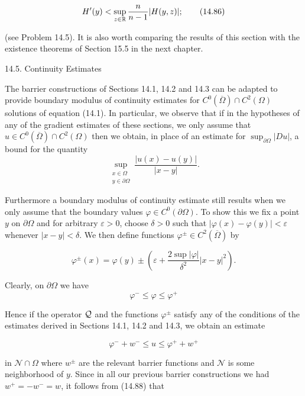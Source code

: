 \begin{equation}
H'(y)<\sup_{z\in\mathbb{R}}\frac{n}{n-1}|H(y,z)|;
\tag{14.86}
\end{equation}

(see Problem 14.5). It is also worth comparing the results of this section with the
existence theorems of Section 15.5 in the next chapter.



14.5. Continuity Estimates

The barrier constructions of Sections 14.1, 14.2 and 14.3 can be adapted to provide
boundary modulus of continuity estimates for $C^0(\overline{\Omega}) \cap C^2(\Omega)$ solutions of
equation (14.1). In particular, we observe that if in the hypotheses of any of the
gradient estimates of these sections, we only assume that $u \in C^0(\overline{\Omega}) \cap C^2(\Omega)$ then
we obtain, in place of an estimate for $\sup_{\partial\Omega} |Du|$, a bound for the quantity
\[
\sup_{\substack{x \in \Omega \\ y \in \partial\Omega}} \frac{|u(x) - u(y)|}{|x - y|}.
\]

Furthermore a boundary modulus of continuity estimate still results when we only
assume that the boundary values $\varphi \in C^0(\partial\Omega)$. To show this we fix a point $y$ on $\partial\Omega$
and for arbitrary $\varepsilon > 0$, choose $\delta > 0$ such that $|\varphi(x) - \varphi(y)| < \varepsilon$ whenever $|x - y| < \delta$.
We then define functions $\varphi^{\pm} \in C^2(\overline{\Omega})$ by

\begin{equation}
\varphi^{\pm}(x) = \varphi(y) \pm \left(\varepsilon + \frac{2 \sup |\varphi|}{\delta^2} |x - y|^2\right).
\tag{14.87}
\end{equation}

Clearly, on $\partial\Omega$ we have
\[
\varphi^- \leq \varphi \leq \varphi^+
\]

Hence if the operator $\mathcal{Q}$ and the functions $\varphi^{\pm}$ satisfy any of the conditions of the
estimates derived in Sections 14.1, 14.2 and 14.3, we obtain an estimate

\begin{equation}
\varphi^- + w^- \leq u \leq \varphi^+ + w^+
\tag{14.88}
\end{equation}

in $\mathcal N \cap \Omega$ where $w^{\pm}$ are the relevant barrier functions and $\mathcal N$ is some neighborhood
of $y$. Since in all our previous barrier constructions we had $w^+ = -w^- = w$, it
follows from (14.88) that

